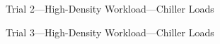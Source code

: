 \documentclass[10pt]{report}
\begin{document}
\begin{landscape}
\begin{figure}[!h]
    \caption{Trial 2---High-Density Workload---Chiller Loads}
\end{figure}
\begin{figure}[!h]
  \centering

    \caption{Trial 3---High-Density Workload---Chiller Loads}
\end{figure}
\begin{figure}[!h]
  \centering


\end{figure}
\end{landscape}
\end{document}
